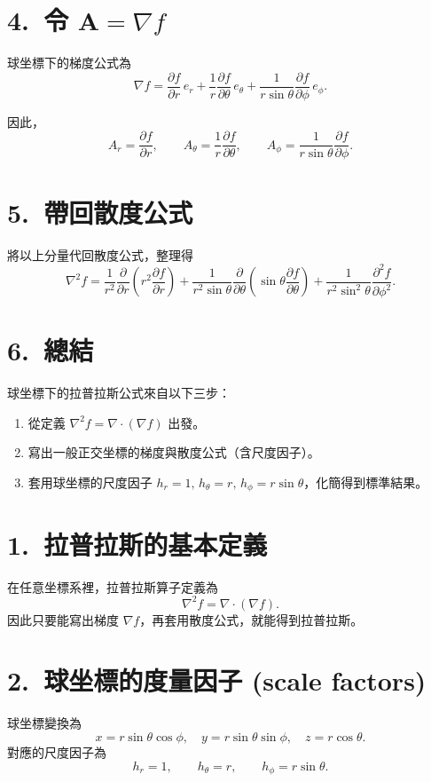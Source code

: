 \documentclass{article}
\def\hat#1{#1}%
\begin{document}
\section*{4.~令 $\mathbf{A} = \nabla f$}
球坐標下的梯度公式為
\[
\nabla f = \frac{\partial f}{\partial r}\,\hat{e}_r
+ \frac{1}{r}\frac{\partial f}{\partial \theta}\,\hat{e}_\theta
+ \frac{1}{r\sin\theta}\frac{\partial f}{\partial \phi}\,\hat{e}_\phi.
\]

因此，
\[
A_r = \frac{\partial f}{\partial r}, \qquad
A_\theta = \frac{1}{r}\frac{\partial f}{\partial \theta}, \qquad
A_\phi = \frac{1}{r\sin\theta}\frac{\partial f}{\partial \phi}.
\]

\section*{5.~帶回散度公式}
將以上分量代回散度公式，整理得
\[
\nabla^2 f =
\frac{1}{r^2}\frac{\partial}{\partial r}\!\left(r^2 \frac{\partial f}{\partial r}\right)
+ \frac{1}{r^2 \sin\theta}\frac{\partial}{\partial \theta}\!\left(\sin\theta \frac{\partial f}{\partial \theta}\right)
+ \frac{1}{r^2 \sin^2\theta}\frac{\partial^2 f}{\partial \phi^2}.
\]

\section*{6.~總結}
球坐標下的拉普拉斯公式來自以下三步：
\begin{enumerate}
    \item 從定義 $\nabla^2 f = \nabla\cdot(\nabla f)$ 出發。
    \item 寫出一般正交坐標的梯度與散度公式（含尺度因子）。
    \item 套用球坐標的尺度因子 $h_r=1,\,h_\theta=r,\,h_\phi=r\sin\theta$，化簡得到標準結果。
\end{enumerate}
\section*{1.~拉普拉斯的基本定義}
在任意坐標系裡，拉普拉斯算子定義為
\[
\nabla^2 f = \nabla \cdot (\nabla f).
\]
因此只要能寫出梯度 $\nabla f$，再套用散度公式，就能得到拉普拉斯。

\section*{2.~球坐標的度量因子 (scale factors)}
球坐標變換為
\[
x = r\sin\theta\cos\phi,\quad
y = r\sin\theta\sin\phi,\quad
z = r\cos\theta.
\]
對應的尺度因子為
\[
h_r = 1,\qquad h_\theta = r,\qquad h_\phi = r\sin\theta.
\]
\end{document}
